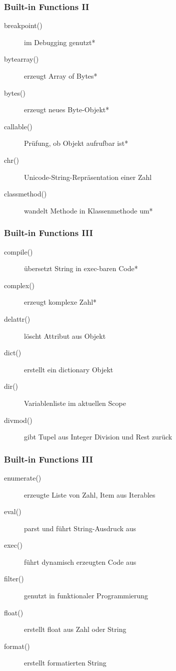\documentclass[ngerman]{beamer}
\begin{document}
\begin{frame}
\frametitle{Built-in Functions II}

\begin{description}
\item[breakpoint()] im Debugging genutzt*
\item[bytearray()] erzeugt Array of Bytes*
\item[bytes()] erzeugt neues Byte-Objekt*
\item[callable()] Prüfung, ob Objekt aufrufbar ist*
\item[chr()] Unicode-String-Repräsentation einer Zahl
\item[classmethod()] wandelt Methode in Klassenmethode um*
\end{description}
\end{frame}


\begin{frame}
\frametitle{Built-in Functions III}

\begin{description}
\item[compile()] übersetzt String in exec-baren Code*
\item[complex()] erzeugt komplexe Zahl*
\item[delattr()] löscht Attribut aus Objekt
\item[dict()] erstellt ein dictionary Objekt
\item[dir()] Variablenliste im aktuellen Scope
\item[divmod()] gibt Tupel aus Integer Division und Rest zurück
\end{description}
\end{frame}


\begin{frame}
\frametitle{Built-in Functions III}

\begin{description}
\item[enumerate()] erzeugte Liste von Zahl, Item aus Iterables
\item[eval()] parst und führt String-Ausdruck aus
\item[exec()] führt dynamisch erzeugten Code aus
\item[filter()] genutzt in funktionaler Programmierung
\item[float()] erstellt float aus Zahl oder String
\item[format()] erstellt formatierten String
\end{description}
\end{frame}
\end{document}
